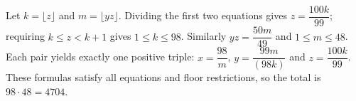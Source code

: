 Let $k=\lfloor z\rfloor$ and $m=\lfloor yz\rfloor$. Dividing the first two equations gives $z=\dfrac{100k}{99}$; requiring $k\le z<k+1$ gives $1\le k\le98$. Similarly $yz=\dfrac{50m}{49}$ and $1\le m\le48$. Each pair yields exactly one positive triple: $x=\dfrac{98}{m}$, $y=\dfrac{99m}{(98k)}$ and $z=\dfrac{100k}{99}$. These formulas satisfy all equations and floor restrictions, so the total is $98\cdot48=\boxed{4704}$.
